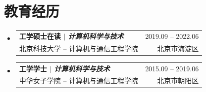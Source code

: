 \documentclass[a4paper,11pt]{ctexart}
\makeatletter
\newcommand{\CVSubheading}[4]{
	\vspace{-2pt}\item
	\begin{tabular*}{0.97\textwidth}[t]{l@{\extracolsep{\fill}}r}
		\textbf{#1} & #2 \\
		\small#3 & \small #4 \\
	\end{tabular*}\vspace{-7pt}
}
\newcommand{\CVSubHeadingListStart}{\begin{itemize}[leftmargin=0.5cm, label={}]}
\newcommand{\CVSubHeadingListEnd}{\end{itemize}}
\makeatother
\begin{document}
	
	

	
	\section{教育经历}
	\CVSubHeadingListStart
	\CVSubheading
	{{工学硕士在读 $|$ \emph{\small{计算机科学与技术}}}}{2019.09 -- 2022.06}
	{北京科技大学 -- 计算机与通信工程学院}{北京市海淀区}
	\CVSubheading
	{{工学学士 $|$ \emph{\small{计算机科学与技术}}}}{2015.09 -- 2019.06}
	{中华女子学院 -- 计算机与通信工程学院}{北京市朝阳区}
	\CVSubHeadingListEnd
	

	
\end{document}
